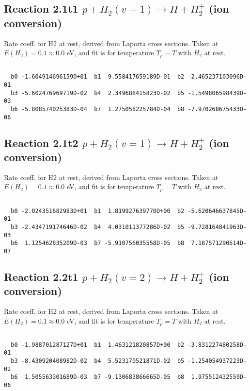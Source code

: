 \documentclass[12pt,dvipdfmx]{article}
\begin{document}
\newpage
\subsection{
Reaction 2.1t1
$ p + H_2(v=1) \rightarrow H + H_2^+$ (ion conversion)
}
Rate coeff. for H2 at rest, derived from Laporta cross sections.
Taken at $E(H_2) = 0.1 \approx 0.0$ eV,  and fit is for temperature $T_p=T$ with $H_2$ at rest.

\begin{small}\begin{verbatim}

  b0 -1.604914696159D+01  b1  9.558417659189D-01  b2 -2.465237103096D-01
  b3 -5.602476969719D-02  b4  2.349688415823D-02  b5 -1.549806598439D-03
  b6 -5.808574025383D-04  b7  1.275058225784D-04  b8 -7.970268675433D-06

\end{verbatim}\end{small}

\newpage
\subsection{
Reaction 2.1t2
$ p + H_2(v=1) \rightarrow H + H_2^+$ (ion conversion)
}
Rate coeff. for H2 at rest, derived from Laporta cross sections.
Taken at $E(H_2) = 0.1 \approx 0.0$ eV,  and fit is for temperature $T_p=T$ with $H_2$ at rest.

\begin{small}\begin{verbatim}

  b0 -2.024351682983D+01  b1  1.819927639770D+00  b2 -5.620646637845D-01
  b3 -2.434719174646D-02  b4  4.031011377286D-02  b5 -9.728164841963D-03
  b6  1.125462835209D-03  b7 -5.910756035558D-05  b8  7.187571290514D-07

\end{verbatim}\end{small}

\newpage
\subsection{
Reaction 2.2t1
$ p + H_2(v=2) \rightarrow H + H_2^+$ (ion conversion)
}
Rate coeff. for H2 at rest, derived from Laporta cross sections.
Taken at $E(H_2) = 0.1 \approx 0.0$ eV,  and fit is for temperature $T_p=T$ with $H_2$ at rest.

\begin{small}\begin{verbatim}

  b0 -1.988701287127D+01  b1  1.463121820857D+00  b2 -3.831227480258D-01
  b3 -8.430920408982D-02  b4  5.523170521871D-02  b5 -1.254054937223D-02
  b6  1.505563301689D-03  b7 -9.130683866665D-05  b8  1.975512432559D-06

\end{verbatim}\end{small}
\end{document}
